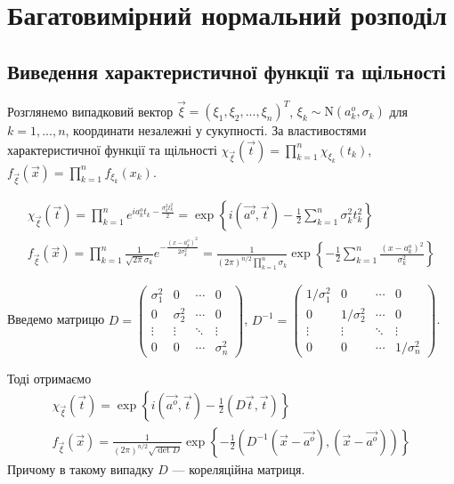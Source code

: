 
\section{Багатовимірний нормальний розподіл}
\subsection{Виведення характеристичної функції та щільності}

Розглянемо випадковий вектор $\vec{\xi} = (\xi_1, \xi_2, ..., \xi_n)^T$, $\xi_k \sim \mathrm{N}(a_k^o, \sigma_k)$ для $k=1,...,n$, координати незалежні у сукупності.
За властивостями характеристичної функції та щільності $\chi_{\vec{\xi}}(\vec{t}) = \prod\limits_{k=1}^n \chi_{\xi_k}(t_k)$,
$f_{\vec{\xi}}(\vec{x}) = \prod\limits_{k=1}^n f_{\xi_k}(x_k)$.

\begin{gather*}
    \chi_{\vec{\xi}}(\vec{t}) = \prod\limits_{k=1}^n e^{i a_k^o t_k - \frac{\sigma_k^2 t_k^2}{2}} = \exp\left\{i(\vec{a^o}, \vec{t}) - \frac{1}{2}\sum\limits_{k=1}^n \sigma_k^2 t_k^2\right\}
    \\
    f_{\vec{\xi}}(\vec{x}) = \prod\limits_{k=1}^n \frac{1}{\sqrt{2\pi}\sigma_k} e^{-\frac{(x-a_k^o)^2}{2\sigma_k^2}} = \frac{1}{(2\pi)^{n/2}\prod_{k=1}^n \sigma_k} \exp \left\{ -\frac{1}{2} \sum_{k=1}^n \frac{(x-a_k^o)^2}{\sigma_k^2}\right\}
\end{gather*}

Введемо матрицю $D = \begin{pmatrix}
    \sigma_1^2 & 0 & \cdots & 0 \\
    0 & \sigma_2^2 & \cdots & 0 \\
    \vdots & \vdots & \ddots & \vdots \\
    0 & 0 & \cdots & \sigma_n^2
\end{pmatrix}$, $D^{-1} = \begin{pmatrix}
    1/\sigma_1^2 & 0 & \cdots & 0 \\
    0 & 1/\sigma_2^2 & \cdots & 0 \\
    \vdots & \vdots & \ddots & \vdots \\
    0 & 0 & \cdots & 1/\sigma_n^2
\end{pmatrix}$.

\noindent Тоді отримаємо
\begin{gather}
    \chi_{\vec{\xi}}(\vec{t}) = \exp\left\{i(\vec{a^o}, \vec{t}) - \frac{1}{2}(D\vec{t}, \vec{t})\right\}
    \\
    f_{\vec{\xi}}(\vec{x}) = \frac{1}{(2\pi)^{n/2} \sqrt{{\det{D}}}} \exp \left\{ -\frac{1}{2} \left( D^{-1}(\vec{x} - \vec{a^o}), (\vec{x} - \vec{a^o})\right)\right\}
\end{gather}
Причому в такому випадку $D$ --- кореляційна матриця.


